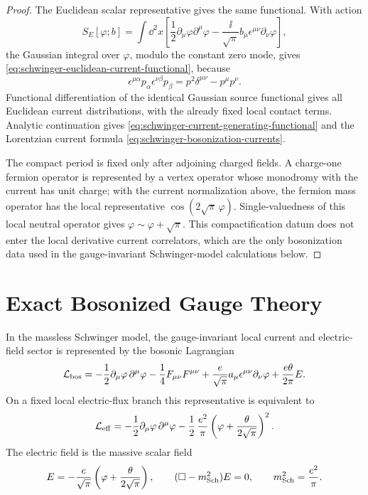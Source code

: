 \begin{proof}
The Euclidean scalar representative gives the same functional.  With action
\[
  S_E[\varphi;b]
  =
  \int\dd^2x
  \left[
    \frac12\partial_\mu\varphi\partial^\mu\varphi
    -\frac{\ii}{\sqrt\pi}b_\mu\epsilon^{\mu\nu}\partial_\nu\varphi
  \right],
\]
the Gaussian integral over \(\varphi\), modulo the constant zero mode, gives
\eqref{eq:schwinger-euclidean-current-functional}, because
  \[
    \epsilon^{\mu\alpha}p_\alpha
    \epsilon^{\nu\beta}p_\beta
    =
    p^2\delta^{\mu\nu}-p^\mu p^\nu .
  \]
Functional differentiation of the identical Gaussian source functional gives
all Euclidean current distributions, with the already fixed local contact
terms.  Analytic continuation gives
\eqref{eq:schwinger-current-generating-functional} and the Lorentzian current
formula \eqref{eq:schwinger-bosonization-currents}.

The compact period is fixed only after adjoining charged fields.  A charge-one
fermion operator is represented by a vertex operator whose monodromy with the
current has unit charge; with the current normalization above, the fermion
mass operator has the local representative
\(\cos(2\sqrt\pi\,\varphi)\).  Single-valuedness of this local neutral
operator gives \(\varphi\sim\varphi+\sqrt\pi\).  This compactification datum
does not enter the local derivative current correlators, which are the only
bosonization data used in the gauge-invariant Schwinger-model calculations
below.
\end{proof}

\section{Exact Bosonized Gauge Theory}

\begin{lemma}
\label{lem:schwinger-exact-bosonized-gauge-sector}
In the massless Schwinger model, the gauge-invariant local current and
electric-field sector is represented by the bosonic Lagrangian
\begin{equation}
  \mathcal L_{\rm bos}
  =
  -\frac12\partial_\mu\varphi\,\partial^\mu\varphi
  -\frac14F_{\mu\nu}F^{\mu\nu}
  +\frac{e}{\sqrt\pi}a_\mu\epsilon^{\mu\nu}\partial_\nu\varphi
  +\frac{e\theta}{2\pi}E .
  \label{eq:schwinger-bosonized-action}
\end{equation}
On a fixed local electric-flux branch this representative is equivalent to
\begin{equation}
  \mathcal L_{\rm eff}
  =
  -\frac12\partial_\mu\varphi\,\partial^\mu\varphi
  -\frac12\,\frac{e^2}{\pi}
  \left(\varphi+\frac{\theta}{2\sqrt\pi}\right)^2 .
  \label{eq:schwinger-effective-massive-scalar}
\end{equation}
The electric field is the massive scalar field
\begin{equation}
  E
  =
  -\frac{e}{\sqrt\pi}
  \left(\varphi+\frac{\theta}{2\sqrt\pi}\right),
  \qquad
  (\Box-m_{\rm Sch}^2)E=0,
  \qquad
  m_{\rm Sch}^2=\frac{e^2}{\pi}.
  \label{eq:schwinger-electric-field-scalar-relation}
\end{equation}
\end{lemma}


